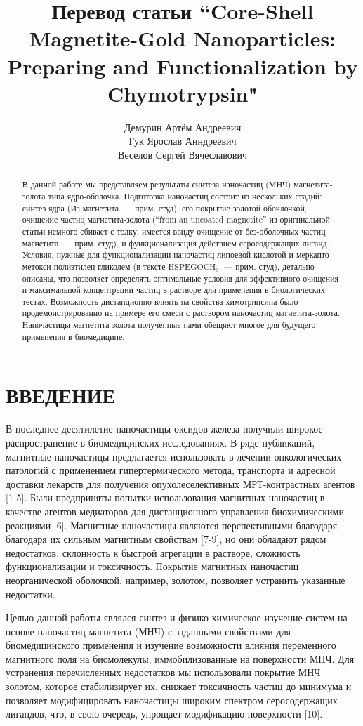 \documentclass[10pt, a4paper]{article}
\title{Перевод статьи ``Core-Shell Magnetite-Gold Nanoparticles: Preparing and Functionalization by Chymotrypsin"}
\author{Демурин Артём Андреевич \\ Гук Ярослав Анндреевич  \\ Веселов Сергей Вячеславович}
\date{}
\begin{document}
\maketitle

\begin{abstract}
В данной работе мы представляем результаты синтеза наночастиц (МНЧ) магнетита-
золота типа ядро-оболочка. Подготовка наночастиц состоит из нескольких стадий:
синтез ядра (Из магнетита. --- прим. студ), его покрытие золотой обочлочкой,
очищение частиц магнетита-золота (``from an uncoated magnetite'' из оригинальной
статьи немного сбивает с толку, имеется ввиду очищение от без-оболочных частиц
магнетита. --- прим. студ), и функционализация действием серосодержащих лиганд.
Условия, нужные для функционализации наночастиц липоевой кислотой и меркапто-метокси
полиэтилен гликолем (в тексте $\text{HSPEGOCH}_3$. --- прим. студ), детально описаны,
что позволяет определять оптимальные условия для эффективного очищения и 
максимальной концентрации частиц в растворе для применения в биологических 
тестах. Возможность дистанционно влиять на свойства химотрипсина было продемонстрированно
на примере его смеси с раствором наночастиц магнетита-золота. Наночастицы
магнетита-золота полученные нами обещяют многое для будущего применения 
в биомедицине.
\end{abstract}

\section*{ВВЕДЕНИЕ}
В последнее десятилетие наночастицы оксидов железа получили широкое распространение в биомедицинских исследованиях. В ряде публикаций,
магнитные наночастицы предлагается использовать в лечении онкологических патологий с применением гипертермического метода,
транспорта и адресной доставки лекарств для получения опухолеселективных МРТ-контрастных агентов [1-5]. Были предприняты попытки использования магнитных наночастиц
в качестве агентов-медиаторов для дистанционного управления биохимическими реакциями [6]. Магнитные наночастицы являются перспективными благодаря
благодаря их сильным магнитным свойствам [7-9], но они обладают рядом недостатков: склонность к быстрой агрегации в
растворе, сложность функционализации и токсичность. Покрытие магнитных наночастиц неорганической оболочкой, например, золотом,
позволяет устранить указанные недостатки.

Целью данной работы являлся синтез и физико-химическое изучение систем на основе наночастиц магнетита (МНЧ)
с заданными свойствами для биомедицинского применения и изучение возможности влияния переменного магнитного поля
на биомолекулы, иммобилизованные на поверхности МНЧ. Для устранения перечисленных недостатков мы использовали покрытие
МНЧ золотом, которое стабилизирует их, снижает токсичность частиц до минимума и позволяет модифицировать
наночастицы широким спектром серосодержащих лигандов, что, в свою очередь, упрощает модификацию поверхности [10].
\end{document}
